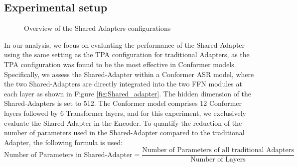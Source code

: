 \subsection{Experimental setup}
\begin{figure}[t]
    \centering
    \caption{Overview of the Shared Adapters configurations}
\end{figure}


In our analysis, we focus on evaluating the performance of the Shared-Adapter using the same setting as the \ac{TPA} configuration for traditional Adapters, as the \ac{TPA} configuration was found to be the most effective in Conformer models. Specifically, we assess the Shared-Adapter within a Conformer \ac{ASR} model, where the two Shared-Adapters are directly integrated into the two \ac{FFN} modules at each layer as shown in Figure \ref{fig:Shared_adapter}.  The hidden dimension of the Shared-Adapters is set to 512. The Conformer model comprises 12 Conformer layers followed by 6 Transformer layers, and for this experiment, we exclusively evaluate the Shared-Adapter in the Encoder.
To quantify the reduction of the number of parameters used in the Shared-Adapter compared to the traditional Adapter, the following formula is used:
\begin{equation}
    \text{Number of Parameters in Shared-Adapter} = \frac{\text{Number of Parameters of all traditional Adapters}}{\text{Number of Layers}}
\end{equation}

